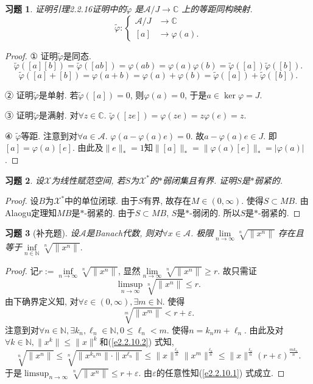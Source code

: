 \documentclass[UTF8,twoside]{ctexbook}
\newtheorem{exercise}{习题}[section]
\newcommand{\h}{\mathscr}
\newcommand{\kx}{\mathbb}
\numberwithin{equation}{section}
\begin{document}
	\begin{exercise}
		证明引理2.2.16证明中的$\widetilde{\varphi}$ 是$\h A/J\rightarrow\kx C$ 上的等距同构映射.
		\[
		\widetilde{\varphi}:\left\{
		\begin{aligned}
		\h A/J&\rightarrow\kx C\\
		[a]&\rightarrow\varphi(a).
		\end{aligned}
		\right.
		\]
	\end{exercise}
	\begin{proof}
		① 证明$\widetilde \varphi$是同态.
		\[
		\widetilde \varphi([a][b])=\widetilde \varphi([ab])=\varphi(ab)=\varphi(a)\varphi(b)=\widetilde\varphi([a])\widetilde\varphi([b]).
		\]
		\[
		\widetilde\varphi([a]+[b])=\varphi(a+b)=\varphi(a)+\varphi(b)=\widetilde\varphi([a])+\widetilde\varphi([b]).
		\]

		② 证明$\widetilde\varphi$是单射. 若$\widetilde\varphi([a])=0$, 则$\varphi(a)=0$, 于是$a\in\ker\varphi=J$.

		③ 证明$\widetilde\varphi$是满射. 对$\forall z\in\kx C$. $\widetilde\varphi([ze])=\varphi(ze)=z\varphi(e)=z$.

		④ $\widetilde\varphi$等距. 注意到对$\forall a\in\h A$. $\varphi(a-\varphi(a)e)=0$. 故$a-\varphi(a)e\in J$. 即$[a]=\varphi(a)[e]$. 由此及$\|e\|_*=1$知$\|[a]\|_*=\|\varphi(a)[e]\|_*=|\varphi(a)|$.
	\end{proof}
	\begin{exercise}
		设$\h X$为线性赋范空间, 若$S$为$\h X^*$的$*$弱闭集且有界. 证明$S$是$*$弱紧的.
	\end{exercise}
	\begin{proof}
		设$B$为$\h X^*$中的单位闭球. 由于$S$有界, 故存在$M\in (0,\infty)$. 使得$S\subset MB$. 由Alaogu定理知$MB$是$*$-弱紧的. 由于$S\subset MB$, $S$是$*$-弱闭的. 所以$S$是$*$-弱紧的.
	\end{proof}
	\begin{exercise}[补充题]
		设$\h A$是Banach代数, 则对$\forall x\in\h A$. 极限$\lim\limits_{n\rightarrow\infty}\sqrt[n]{\|x^n\|}$ 存在且等于$\inf\limits_{n\in\kx N}\sqrt[n]{\|x^n\|}.$
	\end{exercise}
	\begin{proof}
		记$r:=\inf\limits_{n\rightarrow\infty}\sqrt[n]{\|x^n\|}$, 显然$\lim\limits_{n\rightarrow\infty}\sqrt[n]{\|x^n\|}\geq r$. 故只需证
		\begin{equation}\label{e2.2.10.1}
		\limsup_{n\rightarrow\infty}\sqrt[n]{\|x^n\|}\leq r.
		\end{equation}
		由下确界定义知, 对$\forall \varepsilon\in (0,\infty),\exists m\in \kx N$. 使得
		\begin{equation}\label{e2.2.10.2}
		\sqrt[m]{\|x^m\|}<r+\varepsilon.
		\end{equation}
		注意到对$\forall n\in\kx N,\exists k_n,\ell_n\in\kx N,0\leq\ell_n<m$. 使得$n=k_n m +  \ell_n$. 由此及对$\forall k\in\kx N, \|x^k\|\leq\|x\|^k$和(\ref{e2.2.10.2}) 式知,
		\[
		\sqrt[n]{\|x^n\|}\leq \sqrt[n]{\|x^{k_n m}\|\cdot\|x^{\ell_n}\|}\leq \|x\|^{\frac{\ell_n}{n}}\|x^m\|^{\frac{\ell_n}{n}}\leq \|x\|^{\frac{\ell_n}{n}}(r+\varepsilon)^{\frac{mk_n}{n}}.
		\]
		于是$\limsup_{n\rightarrow\infty}\sqrt[n]{\|x^n\|}\leq r+\varepsilon$. 由$\varepsilon$的任意性知(\ref{e2.2.10.1}) 式成立.
	\end{proof}
\end{document}
